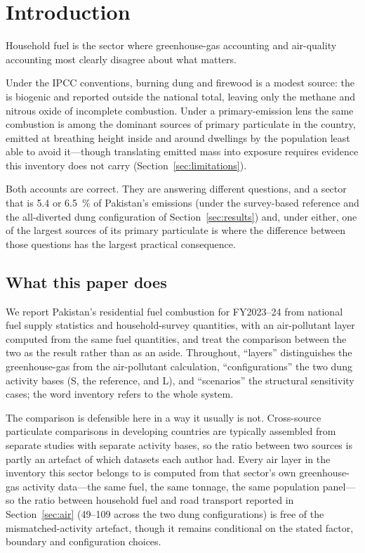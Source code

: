 \section{Introduction}
\label{sec:introduction}

Household fuel is the sector where greenhouse-gas accounting and air-quality accounting most
clearly disagree about what matters.

Under the IPCC conventions, burning dung and firewood is a modest source: the \COtwo{} is
biogenic and reported outside the national total, leaving only the methane and nitrous oxide
of incomplete combustion. Under a primary-emission lens the same combustion is among the dominant sources of
primary particulate in the country, emitted at breathing height inside and around
dwellings by the population least able to avoid it---though translating emitted mass
into exposure requires evidence this inventory does not carry
(Section~\ref{sec:limitations}).

Both accounts are correct. They are answering different questions, and a sector that is
\SI{5.4}{} or \SI{6.5}{\percent} of Pakistan's emissions (under the survey-based reference and
the all-diverted dung configuration of Section~\ref{sec:results}) and, under either, one of
the largest sources of its primary particulate is where the difference between those
questions has the largest practical consequence.

\subsection{What this paper does}

We report Pakistan's residential fuel combustion for FY2023--24 from national fuel supply
statistics and household-survey quantities, with an air-pollutant layer computed from the same fuel quantities, and treat the
comparison between the two as the result rather than as an aside. Throughout,
``layers'' distinguishes the greenhouse-gas from the air-pollutant calculation,
``configurations'' the two dung activity bases (S, the reference, and L), and ``scenarios'' the
structural sensitivity cases; the word inventory refers to the whole system.

The comparison is defensible here in a way it usually is not. Cross-source particulate
comparisons in developing countries are typically assembled from separate studies with
separate activity bases, so the ratio between two sources is partly an artefact of which
datasets each author had. Every air layer in the inventory this sector belongs to is computed
from that sector's own greenhouse-gas activity data---the same fuel, the same tonnage, the
same population panel---so the ratio between household fuel and road transport
reported in Section~\ref{sec:air} (\numrange{49}{109} across the two dung
configurations) is free of the mismatched-activity artefact, though it remains
conditional on the stated factor, boundary and configuration choices.

